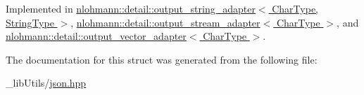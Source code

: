 Implemented in \hyperlink{classnlohmann_1_1detail_1_1output__string__adapter_ab5ea4da075305d225dfd84ad997e8747}{nlohmann\+::detail\+::output\+\_\+string\+\_\+adapter$<$ Char\+Type, String\+Type $>$}, \hyperlink{classnlohmann_1_1detail_1_1output__stream__adapter_ad61375497a7d03cb0bdcddfdaad185d0}{nlohmann\+::detail\+::output\+\_\+stream\+\_\+adapter$<$ Char\+Type $>$}, and \hyperlink{classnlohmann_1_1detail_1_1output__vector__adapter_ad6f6c461dec7bedd5359454dc22fc9aa}{nlohmann\+::detail\+::output\+\_\+vector\+\_\+adapter$<$ Char\+Type $>$}.



The documentation for this struct was generated from the following file\+:\begin{DoxyCompactItemize}
\item 
\+\_\+lib\+Utils/\hyperlink{json_8hpp}{json.\+hpp}\end{DoxyCompactItemize}
